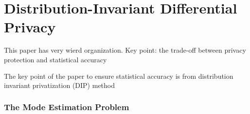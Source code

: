 
\chapter{Distribution-Invariant Differential Privacy}

This paper has very wierd organization.
Key point: the trade-off between privacy protection and statistical accuracy


The key point of the paper to ensure statistical accuracy is from
distribution invariant privatization (DIP) method







\subsection{The Mode Estimation Problem}
